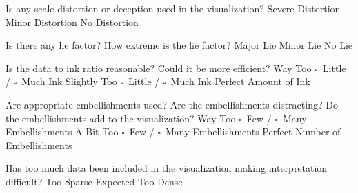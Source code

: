 \documentclass[a4paper,12pt]{article}
\begin{document}
        
\EndTable  



	{Is any scale distortion or deception used in the visualization?}	
	{\choice Severe Distortion}
	{\choice Minor Distortion}
	{\choice No Distortion} 
        
	{Is there any lie factor? How extreme is the lie factor?}
	{\choice Major Lie}
	{\choice Minor Lie}
	{\choice No Lie} 

	{Is the data to ink ratio reasonable? Could it be more efficient?}
	{Way Too $\square$~Little / $\square$~Much Ink}
	{Slightly Too $\square$~Little / $\square$~Much Ink}
	{\choice Perfect Amount of Ink} 
        
	{Are appropriate embellishments used? Are the embellishments 
    	distracting? Do the embellishments add to the visualization?}
	{Way Too $\square$~Few / $\square$~Many Embellishments}
	{A Bit Too $\square$~Few / $\square$~Many Embellishments}
	{\choice Perfect Number of Embellishments} 
        
	{Has too much data been included in the visualization making 
    	interpretation difficult? } 
	{\choice Too Sparse}
	{\choice Expected}
	{\choice Too Dense} 
        
\EndTable  
        
\end{document}
